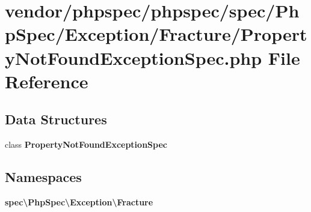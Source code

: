 \section{vendor/phpspec/phpspec/spec/\+Php\+Spec/\+Exception/\+Fracture/\+Property\+Not\+Found\+Exception\+Spec.php File Reference}
\label{_property_not_found_exception_spec_8php}
\subsection*{Data Structures}
\begin{DoxyCompactItemize}
\item 
class {\bf Property\+Not\+Found\+Exception\+Spec}
\end{DoxyCompactItemize}
\subsection*{Namespaces}
\begin{DoxyCompactItemize}
\item 
 {\bf spec\textbackslash{}\+Php\+Spec\textbackslash{}\+Exception\textbackslash{}\+Fracture}
\end{DoxyCompactItemize}
